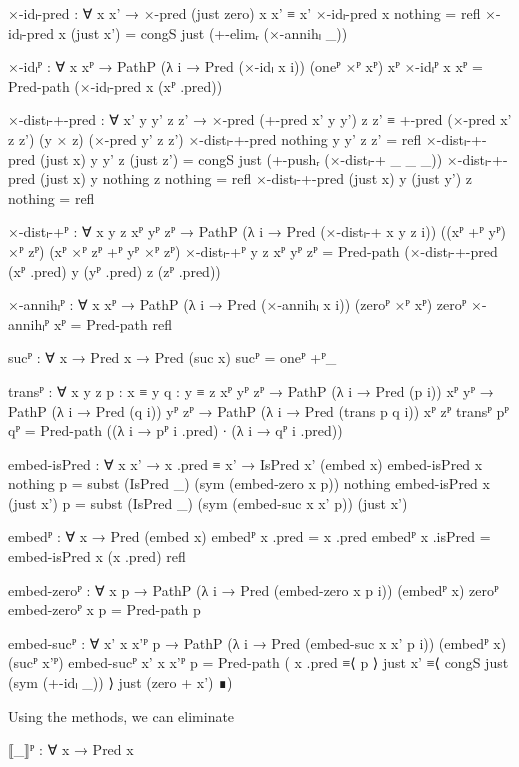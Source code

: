 \begin{code}[hide]
  ×-idₗ-pred : ∀ x x' → ×-pred (just zero) x x' ≡ x'
  ×-idₗ-pred x nothing = refl
  ×-idₗ-pred x (just x') = congS just (+-elimᵣ (×-annihₗ _))

  ×-idₗᴾ : ∀ {x} xᴾ → PathP (λ i → Pred (×-idₗ x i)) (oneᴾ ×ᴾ xᴾ) xᴾ
  ×-idₗᴾ {x} xᴾ = Pred-path (×-idₗ-pred x (xᴾ .pred))

  ×-distₗ-+-pred :
    ∀ x' y y' z z' →
    ×-pred (+-pred x' y y') z z' ≡
    +-pred (×-pred x' z z') (y × z) (×-pred y' z z')
  ×-distₗ-+-pred nothing y y' z z' = refl
  ×-distₗ-+-pred (just x) y y' z (just z') =
    congS just (+-pushᵣ (×-distₗ-+ _ _ _))
  ×-distₗ-+-pred (just x) y nothing z nothing = refl
  ×-distₗ-+-pred (just x) y (just y') z nothing = refl

  ×-distₗ-+ᴾ :
    ∀ {x y z} xᴾ yᴾ zᴾ →
    PathP (λ i → Pred (×-distₗ-+ x y z i))
      ((xᴾ +ᴾ yᴾ) ×ᴾ zᴾ) (xᴾ ×ᴾ zᴾ +ᴾ yᴾ ×ᴾ zᴾ)
  ×-distₗ-+ᴾ {y} {z} xᴾ yᴾ zᴾ =
    Pred-path (×-distₗ-+-pred (xᴾ .pred) y (yᴾ .pred) z (zᴾ .pred))

  ×-annihₗᴾ : ∀ {x} xᴾ → PathP (λ i → Pred (×-annihₗ x i)) (zeroᴾ ×ᴾ xᴾ) zeroᴾ
  ×-annihₗᴾ xᴾ = Pred-path refl

  sucᴾ : ∀ {x} → Pred x → Pred (suc x)
  sucᴾ = oneᴾ +ᴾ_

  transᴾ :
    ∀ {x y z} {p : x ≡ y} {q : y ≡ z} {xᴾ yᴾ zᴾ} →
    PathP (λ i → Pred (p i)) xᴾ yᴾ → PathP (λ i → Pred (q i)) yᴾ zᴾ →
    PathP (λ i → Pred (trans p q i)) xᴾ zᴾ
  transᴾ pᴾ qᴾ = Pred-path ((λ i → pᴾ i .pred) ∙ (λ i → qᴾ i .pred))

  embed-isPred : ∀ x x' → x .pred ≡ x' → IsPred x' (embed x)
  embed-isPred x nothing p = subst (IsPred _) (sym (embed-zero x p)) nothing
  embed-isPred x (just x') p =
    subst (IsPred _) (sym (embed-suc x x' p)) (just x')

  embedᴾ : ∀ x → Pred (embed x)
  embedᴾ x .pred = x .pred
  embedᴾ x .isPred = embed-isPred x (x .pred) refl

  embed-zeroᴾ : ∀ x p → PathP (λ i → Pred (embed-zero x p i)) (embedᴾ x) zeroᴾ
  embed-zeroᴾ x p = Pred-path p

  embed-sucᴾ :
    ∀ {x'} x x'ᴾ p →
    PathP (λ i → Pred (embed-suc x x' p i)) (embedᴾ x) (sucᴾ x'ᴾ)
  embed-sucᴾ {x'} x x'ᴾ p = Pred-path
    ( x .pred           ≡⟨ p ⟩
      just x'          ≡⟨ congS just (sym (+-idₗ _)) ⟩
      just (zero + x') ∎)
\end{code}
Using the methods, we can eliminate
\begin{code}
  ⟦_⟧ᴾ : ∀ x → Pred x
\end{code}
